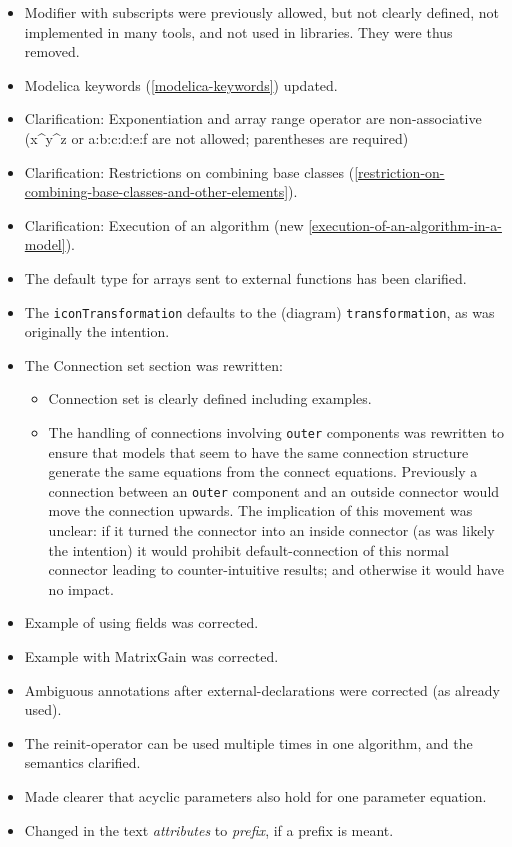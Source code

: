 \begin{itemize}
\item
  Modifier with subscripts were previously allowed, but not clearly
  defined, not implemented in many tools, and not used in libraries.
  They were thus removed.
\item
  Modelica keywords (\autoref{modelica-keywords}) updated.
\item
  Clarification: Exponentiation and array range operator are
  non-associative\\
  (x\^{}y\^{}z or a:b:c:d:e:f are not allowed; parentheses are required)
\item
  Clarification: Restrictions on combining base classes (\autoref{restriction-on-combining-base-classes-and-other-elements}).
\item
  Clarification: Execution of an algorithm (new \autoref{execution-of-an-algorithm-in-a-model}).
\item
  The default type for arrays sent to external functions has been
  clarified.
\item
  The \lstinline!iconTransformation! defaults to the (diagram)
  \lstinline!transformation!, as was originally the intention.
\item
  The Connection set section was rewritten:

  \begin{itemize}
  \item
    Connection set is clearly defined including examples.
  \item
    The handling of connections involving \lstinline!outer! components was rewritten
    to ensure that models that seem to have the same connection
    structure generate the same equations from the connect equations.
    Previously a connection between an \lstinline!outer! component and an outside
    connector would move the connection upwards. The implication of this
    movement was unclear: if it turned the connector into an inside
    connector (as was likely the intention) it would prohibit
    default-connection of this normal connector leading to
    counter-intuitive results; and otherwise it would have no impact.
  \end{itemize}
\item
  Example of using fields was corrected.
\item
  Example with MatrixGain was corrected.
\item
  Ambiguous annotations after external-declarations were corrected (as
  already used).
\item
  The reinit-operator can be used multiple times in one algorithm, and
  the semantics clarified.
\item
  Made clearer that acyclic parameters also hold for one parameter
  equation.
\item
  Changed in the text \emph{attributes} to \emph{prefix}, if a prefix is
  meant.
\end{itemize}

